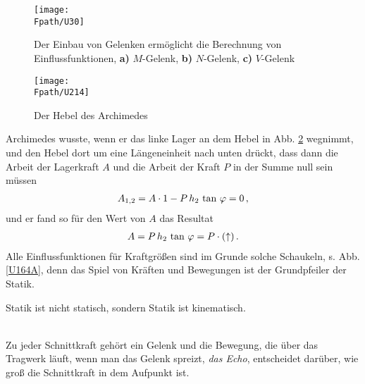\begin{figure}[tbp]
\centering
\if {} \sidecaption \fi
\texttt{[image: \\Fpath/U30]}
\caption{Der Einbau von Gelenken erm\"{o}glicht die Berechnung von Einflussfunktionen, \textbf{ a)} $M$-Gelenk, \textbf{ b)} $N$-Gelenk, \textbf{ c)} $V$-Gelenk } \label{U30}
\end{figure}%

\begin{figure}[tbp]
\centering
\if {} \sidecaption \fi
\texttt{[image: \\Fpath/U214]}
\caption{Der Hebel des Archimedes} \label{U214}
%
\end{figure}%


Archimedes wusste, wenn er das linke Lager an dem Hebel in Abb. \ref{U214} wegnimmt, und den Hebel dort um eine L\"{a}ngeneinheit nach unten dr\"{u}ckt, dass dann die Arbeit der Lagerkraft $A$ und die Arbeit der Kraft $P$ in der Summe null sein m\"{u}ssen
\begin{align}
A_{1,2} = A \cdot 1 - P\,h_2\,\tan\,\varphi = 0\,,
\end{align}
und er fand so f\"{u}r den Wert von $A$ das Resultat
\begin{align}
A = P\,h_2\,\tan\,\varphi = P \cdot (\uparrow)\,.
\end{align}
Alle Einflussfunktionen f\"{u}r Kraftgr\"{o}{\ss}en sind im Grunde solche \glq Schaukeln\grq{}, s. Abb. \ref{U164A}, denn das Spiel von Kr\"{a}ften und Bewegungen ist der Grundpfeiler der Statik.\\

\hspace*{-12pt}\colorbox{highlightBlue}{\parbox{0.98\textwidth}{Statik ist nicht statisch, sondern Statik ist \glq kinematisch\grq{}.}}\\

Zu jeder Schnittkraft geh\"{o}rt ein Gelenk und die Bewegung, die \"{u}ber das Tragwerk l\"{a}uft, wenn man das Gelenk spreizt, {\em das Echo\/}, entscheidet dar\"{u}ber, wie gro{\ss} die Schnittkraft in dem Aufpunkt ist.



